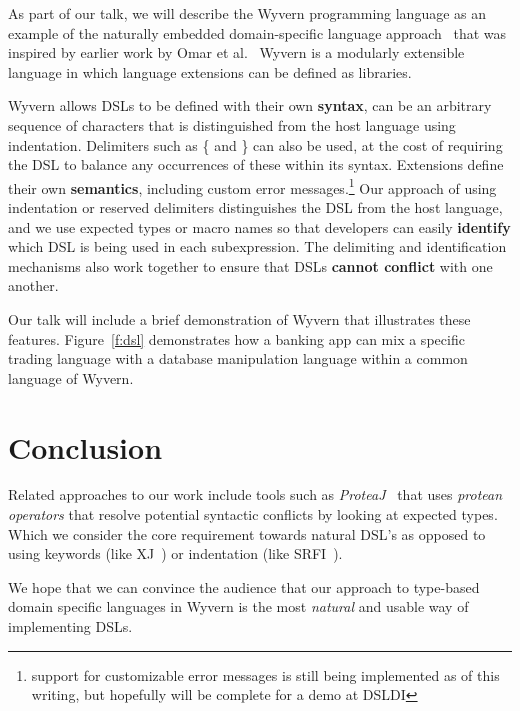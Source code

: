 \documentclass[preprint]{sigplanconf}
\begin{document}
As part of our talk, we will describe the Wyvern programming language
as an example of the naturally embedded domain-specific language
approach~\cite{omar:2014:tsls} that was inspired by earlier work by Omar et al.~\cite{ACC_VLHCC}
Wyvern is a modularly extensible language in which language
extensions can be defined as libraries.

Wyvern allows DSLs to be defined with their own \textbf{syntax}, can be
an arbitrary sequence of characters that is distinguished from the host
language using indentation.  Delimiters such as \{ and \} can also be
used, at the cost of requiring the DSL to balance any occurrences of
these within its syntax.  Extensions define their own \textbf{semantics},
including custom error messages.\footnote{support for customizable
error messages is still being implemented as of this writing, but
hopefully will be complete for a demo at DSLDI}  Our approach of
using indentation or reserved delimiters distinguishes the DSL from
the host language, and we use expected types or macro names so that
developers can easily \textbf{identify} which DSL is being used in each
subexpression.  The delimiting and identification mechanisms also work
together to ensure that DSLs \textbf{cannot conflict} with one another.

Our talk will include a brief demonstration of Wyvern that illustrates
these features. Figure~\ref{f:dsl} demonstrates how a banking app can mix a specific trading language with a database manipulation language within a common language of Wyvern.

\section{Conclusion}

Related approaches to our work include tools such as \textit{ProteaJ}~\cite{Ichikawa:2014:CUO:2584469.2577092} that uses \textit{protean operators} that resolve potential syntactic conflicts by looking at expected types. Which we consider the core requirement towards natural DSL's as opposed to using keywords (like XJ~\cite{DBLP:conf/scam/ClarkSW08}) or indentation (like SRFI~\cite{srfi-49}).

We hope that we can convince the audience that our approach to type-based domain specific languages in Wyvern is the most \textit{natural} and usable way of implementing DSLs.




\end{document}
